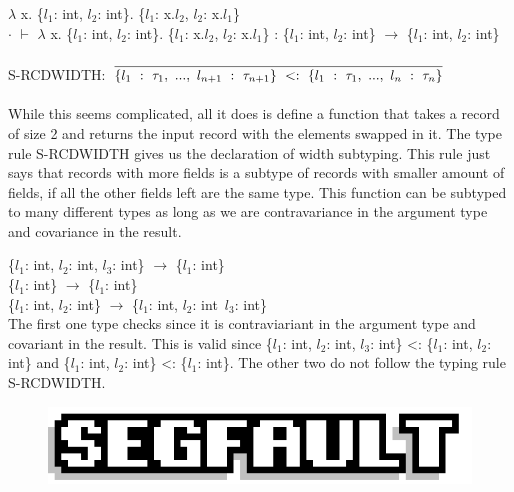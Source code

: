 \documentclass[9pt]{extarticle} %
\newcommand{\cmark}{\ding{51}}%
\newcommand{\xmark}{\ding{55}}%
\begin{document}
\begin{minipage}[t]{.52\linewidth}
$\lambda$ x. \{$l_1$: int, $l_2$: int\}. \{$l_1$: x.$l_2$, $l_2$: x.$l_1$\} \\
$\cdot$ $\vdash$ $\lambda$ x. \{$l_1$: int, $l_2$: int\}. \{$l_1$: x.$l_2$, $l_2$: x.$l_1$\} : \{$l_1$: int, $l_2$: int\} $\rightarrow$ \{$l_1$: int, $l_2$: int\}  \\
\\
S-RCDWIDTH: 
$\infer{\{l_1\ :\ \tau_1,\ ...,\ l_{n+1}\ :\ \tau_{n+1}\}\ <:\ \{l_1\ :\ \tau_1,\ ...,\ l_n\ :\ \tau_n\}}{}$ \\
\\
While this seems complicated, all it does is define a function that takes a record
of size 2 and returns the input record with the elements swapped in it. The type 
rule S-RCDWIDTH gives us the declaration of width subtyping. This rule just says
that records with more fields is a subtype of records with smaller amount of fields,
if all the other fields left are the same type. This function can be subtyped to 
many different types as long as we are contravariance in the argument type and covariance in the result. 

\cmark \{$l_1$: int, $l_2$: int, $l_3$: int\} $\rightarrow$ \{$l_1$: int\} \\
\xmark \{$l_1$: int\} $\rightarrow$ \{$l_1$: int\} \\
\xmark \{$l_1$: int, $l_2$: int\} $\rightarrow$ \{$l_1$: int, $l_2$: int\, $l_3$: int\}  \\
The first one type checks since it is contraviariant in the argument type and
covariant in the result. This is valid since
\{$l_1$: int, $l_2$: int, $l_3$: int\} <: \{$l_1$: int, $l_2$: int\} and 
\{$l_1$: int, $l_2$: int\} <: \{$l_1$: int\}. The other two do not follow the
typing rule S-RCDWIDTH. 

\end{minipage} %
\newpage


\begin{figure}[H]
\centering\vspace{0.5cm}\includegraphics[width=0.8\linewidth]{imgs/segfault.png}
\end{figure}
\end{document}
